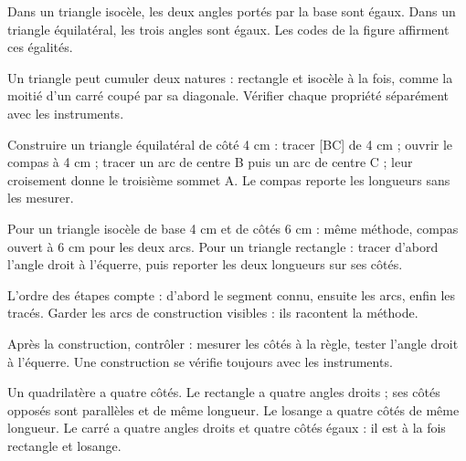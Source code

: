 \begin{propriete}Dans un triangle isocèle, les deux angles portés par la base sont égaux. Dans un triangle équilatéral, les trois angles sont égaux. Les codes de la figure affirment ces égalités.\end{propriete}
\begin{attention}Un triangle peut cumuler deux natures : rectangle et isocèle à la fois, comme la moitié d’un carré coupé par sa diagonale. Vérifier chaque propriété séparément avec les instruments.\end{attention}
\clearpage
{}\label{cours-16-2}
\begin{savoirfaire}Construire un triangle équilatéral de côté 4 cm : tracer [BC] de 4 cm ; ouvrir le compas à 4 cm ; tracer un arc de centre B puis un arc de centre C ; leur croisement donne le troisième sommet A. Le compas reporte les longueurs sans les mesurer.\end{savoirfaire}
\begin{exemple}Pour un triangle isocèle de base 4 cm et de côtés 6 cm : même méthode, compas ouvert à 6 cm pour les deux arcs. Pour un triangle rectangle : tracer d’abord l’angle droit à l’équerre, puis reporter les deux longueurs sur ses côtés.\end{exemple}
\begin{propriete}L’ordre des étapes compte : d’abord le segment connu, ensuite les arcs, enfin les tracés. Garder les arcs de construction visibles : ils racontent la méthode.\end{propriete}
\begin{savoirfaire}Après la construction, contrôler : mesurer les côtés à la règle, tester l’angle droit à l’équerre. Une construction se vérifie toujours avec les instruments.\end{savoirfaire}
\clearpage
{}\label{cours-16-3}
\begin{definition}Un quadrilatère a quatre côtés. Le rectangle a quatre angles droits ; ses côtés opposés sont parallèles et de même longueur. Le losange a quatre côtés de même longueur. Le carré a quatre angles droits et quatre côtés égaux : il est à la fois rectangle et losange.\end{definition}
\label{fig-cours-16-3-cours-quadrilateres}


